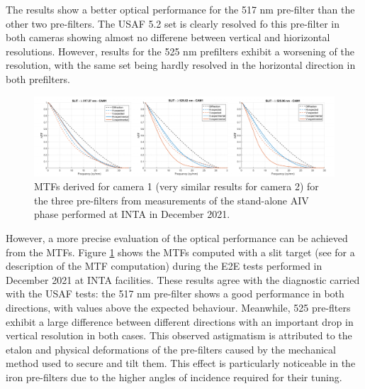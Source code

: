 The results show a better optical performance for the 517 nm pre-filter than the other two pre-filters. The USAF 5.2 set is clearly resolved fo this pre-filter in both cameras showing almost no differene between vertical and hiorizontal resolutions. However, results for the 525 nm prefilters exhibit a worsening of the resolution, with the same set being hardly resolved in the horizontal direction in both prefilters. 

\begin{figure}
    \includegraphics[width=\textwidth]{figures/TuMag/mtfs.pdf}
    \caption{MTFs derived for camera 1 (very similar results for camera 2) for the three pre-filters from measurements of the stand-alone AIV phase performed at INTA in December 2021.  
      \label{fig_tumag:mtfs}}
\end{figure}


However, a more precise evaluation of the optical performance can be achieved from the MTFs. Figure \ref{fig_tumag:mtfs} shows the MTFs computed with a slit target (see \cite{slanted-method} for a description of the MTF computation) during the E2E tests performed in December 2021 at INTA facilities. These results agree with the diagnostic carried with the USAF tests: the 517 nm pre-filter shows a good performance in both directions, with values above the expected behaviour. Meanwhile, 525 pre-flters exhibit a large difference between different directions with an important drop in vertical resolution in both cases. This observed astigmatism is attributed to the etalon and physical deformations of the pre-filters caused by the mechanical method used to secure and tilt them. This effect is particularly noticeable in the iron pre-filters due to the higher angles of incidence required for their tuning.

